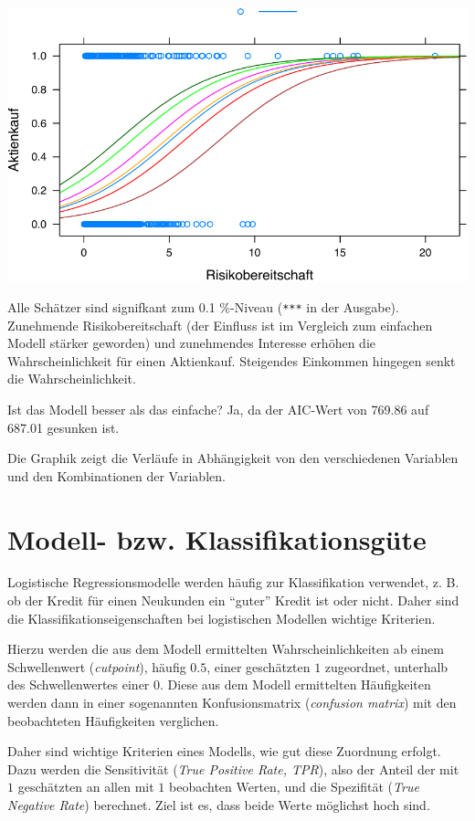 \documentclass[12pt,]{book}
\begin{document}
\begin{center}\includegraphics[width=0.7\linewidth]{072_klassifizierende_Regression_files/figure-latex/glm2_tips-1} \end{center}

Alle Schätzer sind signifkant zum 0.1 \%-Niveau (\texttt{***} in der
Ausgabe). Zunehmende Risikobereitschaft (der Einfluss ist im Vergleich
zum einfachen Modell stärker geworden) und zunehmendes Interesse erhöhen
die Wahrscheinlichkeit für einen Aktienkauf. Steigendes Einkommen
hingegen senkt die Wahrscheinlichkeit.

Ist das Modell besser als das einfache? Ja, da der AIC-Wert von 769.86
auf 687.01 gesunken ist.

Die Graphik zeigt die Verläufe in Abhängigkeit von den verschiedenen
Variablen und den Kombinationen der Variablen.

\section{Modell- bzw.
Klassifikationsgüte}\label{modell--bzw.-klassifikationsgute}

Logistische Regressionsmodelle werden häufig zur Klassifikation
verwendet, z. B. ob der Kredit für einen Neukunden ein ``guter'' Kredit
ist oder nicht. Daher sind die Klassifikationseigenschaften bei
logistischen Modellen wichtige Kriterien.

Hierzu werden die aus dem Modell ermittelten Wahrscheinlichkeiten ab
einem Schwellenwert (\emph{cutpoint}), häufig \(0.5\), einer geschätzten
\(1\) zugeordnet, unterhalb des Schwellenwertes einer \(0\). Diese aus
dem Modell ermittelten Häufigkeiten werden dann in einer sogenannten
Konfusionsmatrix (\emph{confusion matrix}) mit den beobachteten
Häufigkeiten verglichen.

Daher sind wichtige Kriterien eines Modells, wie gut diese Zuordnung
erfolgt. Dazu werden die Sensitivität (\emph{True Positive Rate, TPR}),
also der Anteil der mit \(1\) geschätzten an allen mit \(1\) beobachten
Werten, und die Spezifität (\emph{True Negative Rate}) berechnet. Ziel
ist es, dass beide Werte möglichst hoch sind.
\end{document}
